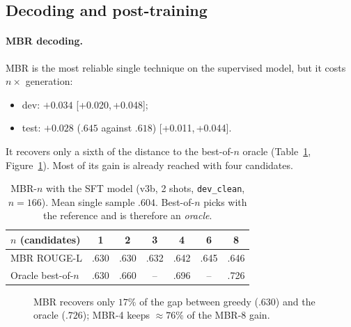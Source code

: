 \documentclass[11pt,a4paper]{article}
\newcommand{\rl}{ROUGE-L}
\newcommand{\ci}[2]{{\scriptsize[#1,\,#2]}}
\begin{document}
\subsection{Decoding and post-training}\label{sec:posttrain}
\paragraph{MBR decoding.}
MBR is the most reliable single technique on the supervised model, but it costs $n\times$ generation:
\begin{itemize}[leftmargin=*]
\item dev: $+0.034$ \ci{+0.020}{+0.048};
\item test: $+0.028$ ($.645$ against $.618$) \ci{+0.011}{+0.044}.
\end{itemize}
It recovers only a sixth of the distance to the best-of-$n$ oracle (Table~\ref{tab:mbrn}, Figure~\ref{fig:mbrn}). Most of its gain is already reached with four candidates.
\begin{table}[H]
\centering
\caption{MBR-$n$ with the SFT model (v3b, 2 shots, \texttt{dev\_clean}, $n{=}166$). Mean single sample $.604$. Best-of-$n$ picks with the reference and is therefore an \emph{oracle}.}\label{tab:mbrn}
\begin{tabular}{@{}lcccccc@{}}
\toprule
$n$ (candidates) & 1 & 2 & 3 & 4 & 6 & 8\\
\midrule
MBR \rl{} & .630 & .630 & .632 & .642 & .645 & .646\\
Oracle best-of-$n$ & .630 & .660 & -- & .696 & -- & .726\\
\bottomrule
\end{tabular}
\end{table}
\begin{figure}[H]
\centering
{}
\caption{MBR recovers only $17\%$ of the gap between greedy ($.630$) and the oracle ($.726$); MBR-4 keeps $\approx\!76\%$ of the MBR-8 gain.}\label{fig:mbrn}
\end{figure}
\end{document}
